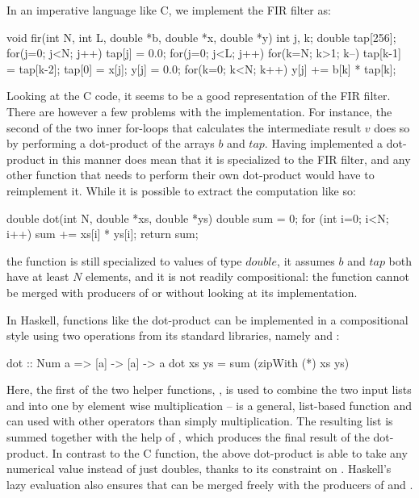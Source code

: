 In an imperative language like C, we implement the FIR filter as:

\begin{code}
void fir(int N, int L, double *b, double *x, double *y)
{
 int j, k;
 double tap[256];
 for(j=0; j<N; j++) tap[j] = 0.0;
 for(j=0; j<L; j++)
 {
  for(k=N; k>1; k--) tap[k-1] = tap[k-2];
  tap[0] = x[j];
  y[j] = 0.0;
  for(k=0; k<N; k++) y[j] += b[k] * tap[k];
 }
}
\end{code}

\noindent Looking at the C code, it seems to be a good representation of the FIR filter. There are however a few problems with the implementation. For instance, the second of the two inner for-loops that calculates the intermediate result $v$ does so by performing a dot-product of the arrays $b$ and $tap$. Having implemented a dot-product in this manner does mean that it is specialized to the FIR filter, and any other function that needs to perform their own dot-product would have to reimplement it. While it is possible to extract the computation like so:

\begin{code}
double dot(int N, double *xs, double *ys)
{
  double sum = 0;
  for (int i=0; i<N; i++) sum += xs[i] * ys[i];
  return sum;
}
\end{code}

\noindent the function is still specialized to values of type $double$, it assumes $b$ and $tap$ both have at least $N$ elements, and it is not readily compositional: the function cannot be merged with producers of  or  without looking at its implementation.

In Haskell, functions like the dot-product can be implemented in a compositional style using two operations from its standard libraries, namely  and :

\begin{code}
dot :: Num a => [a] -> [a] -> a
dot xs ys = sum (zipWith (*) xs ys)
\end{code}

\noindent Here, the first of the two helper functions, , is used to combine the two input lists  and  into one by element wise multiplication --  is a general, list-based function and can used with other operators than simply multiplication. The resulting list is summed together with the help of , which produces the final result of the dot-product. In contrast to the C function, the above dot-product is able to take any numerical value instead of just doubles, thanks to its  constraint on . Haskell's lazy evaluation also ensures that  can be merged freely with the producers of  and .

